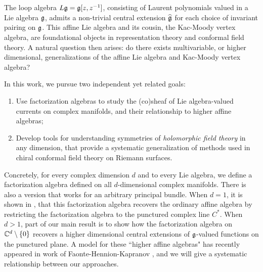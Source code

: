 \section*{}


The loop algebra $L\mathfrak g = \mathfrak g[z,z^{-1}]$, consisting of Laurent polynomials valued in a Lie algebra $\mathfrak g$,
admits a non-trivial central extension $\widehat{\mathfrak g}$ for each choice of invariant pairing on $\mathfrak g$.
This affine Lie algebra and its cousin, the Kac-Moody vertex algebra, are foundational objects in representation theory and conformal field theory. 
A natural question then arises: do there exists multivariable, or higher dimensional, generalizations of the affine Lie algebra and Kac-Moody vertex algebra? 

In this work, we pursue two independent yet related goals:
 
\begin{enumerate}
\item Use factorization algebras to study the (co)sheaf of Lie algebra-valued currents on complex manifolds, and their relationship to higher affine algebras;
\item Develop tools for understanding symmetries of {\em holomorphic field theory} in any dimension, that provide a systematic generalization of methods used in chiral conformal field theory on Riemann surfaces.
\end{enumerate}

Concretely, for every complex dimension $d$ and to every Lie algebra, we define a factorization algebra defined on all $d$-dimensional complex manifolds. 
There is also a version that works for an arbitrary principal bundle. 
When $d=1$, it is shown in \cite{CG1}, that this factorization algebra recovers the ordinary affine algebra by restricting the factorization algebra to the punctured complex line $C^*$. 
When $d > 1$, part of our main result is to show how the factorization algebra on $\mathbb C^d \setminus \{0\}$ recovers a higher dimensional central extensions of $\mathfrak g$-valued functions on the punctured plane. 
A model for these ``higher affine algebras" has recently appeared in work of Faonte-Hennion-Kapranov \cite{FHK}, and we will give a systematic relationship between our approaches. 

